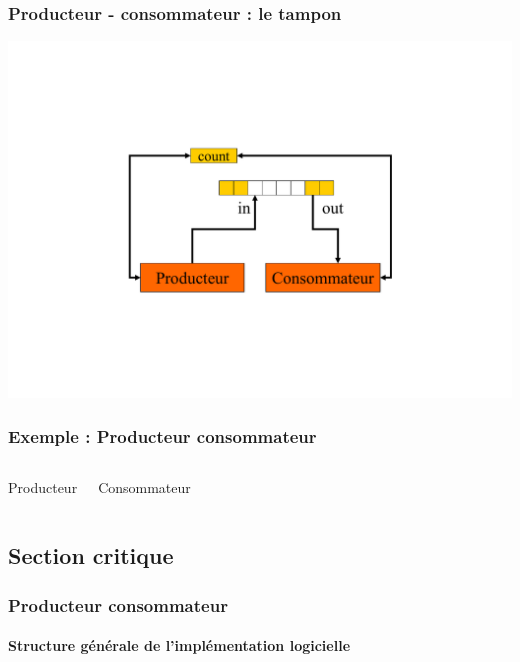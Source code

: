 \begin{frame}
\frametitle{Producteur - consommateur : le tampon}
\includegraphics[width=.9\textwidth]{../illustration/prod_consom_tampon.pdf}
\end{frame}

\begin{frame}
\frametitle{Exemple : Producteur consommateur}
\begin{columns}
\begin{block}{Producteur}
\begin{scriptsize}\end{scriptsize}
\end{block}
\begin{block}{Consommateur}
\begin{scriptsize}

\end{scriptsize}
\end{block}
\end{columns}
\end{frame}

\subsection{Section critique}

\begin{frame}
\frametitle{Producteur consommateur }
\framesubtitle{Structure générale de l'implémentation logicielle}
\begin{scriptsize}\end{scriptsize}
\end{frame}

